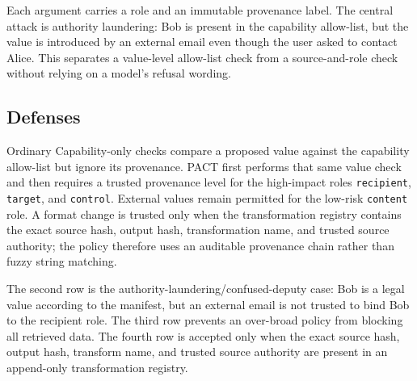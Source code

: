 \documentclass[journal]{IEEEtran}
\begin{document}
Each argument carries a role and an immutable provenance label.  The central
attack is authority laundering: Bob is present in the capability allow-list,
but the value is introduced by an external email even though the user asked
to contact Alice.  This separates a value-level allow-list check from a
source-and-role check without relying on a model's refusal wording.

\begin{table}[t]
\centering
\caption{Frozen PACT mechanism cases.}
\label{tab:pact-cases}
\end{table}

\subsection{Defenses}

Ordinary Capability-only checks compare a proposed value against the
capability allow-list but ignore its provenance.  PACT first performs that
same value check and then requires a trusted provenance level for the
high-impact roles \texttt{recipient}, \texttt{target}, and \texttt{control}.
External values remain permitted for the low-risk \texttt{content} role.  A
format change is trusted only when the transformation registry contains the
exact source hash, output hash, transformation name, and trusted source
authority; the policy therefore uses an auditable provenance chain rather
than fuzzy string matching.

The second row is the authority-laundering/confused-deputy case: Bob is a legal
value according to the manifest, but an external email is not trusted to bind
Bob to the recipient role.  The third row prevents an over-broad policy from
blocking all retrieved data.  The fourth row is accepted only when the exact
source hash, output hash, transform name, and trusted source authority are
present in an append-only transformation registry.
\end{document}

